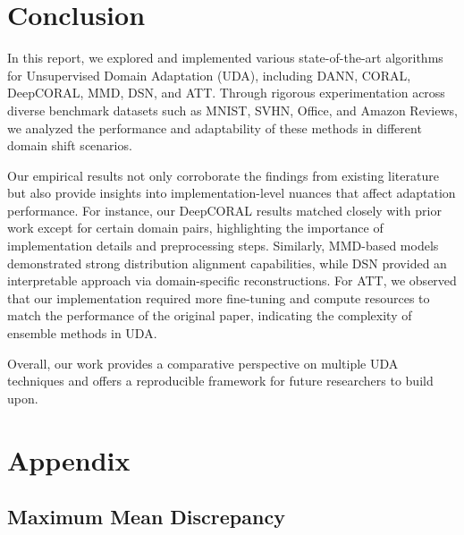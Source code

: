 \documentclass{article}
\begin{document}



\section{Conclusion}

In this report, we explored and implemented various state-of-the-art algorithms for Unsupervised Domain Adaptation (UDA), including DANN, CORAL, DeepCORAL, MMD, DSN, and ATT. Through rigorous experimentation across diverse benchmark datasets such as MNIST, SVHN, Office, and Amazon Reviews, we analyzed the performance and adaptability of these methods in different domain shift scenarios.

Our empirical results not only corroborate the findings from existing literature but also provide insights into implementation-level nuances that affect adaptation performance. For instance, our DeepCORAL results matched closely with prior work except for certain domain pairs, highlighting the importance of implementation details and preprocessing steps. Similarly, MMD-based models demonstrated strong distribution alignment capabilities, while DSN provided an interpretable approach via domain-specific reconstructions. For ATT, we observed that our implementation required more fine-tuning and compute resources to match the performance of the original paper, indicating the complexity of ensemble methods in UDA.

Overall, our work provides a comparative perspective on multiple UDA techniques and offers a reproducible framework for future researchers to build upon.

\newpage
\section*{Appendix}

\subsection*{Maximum Mean Discrepancy}
\end{document}

